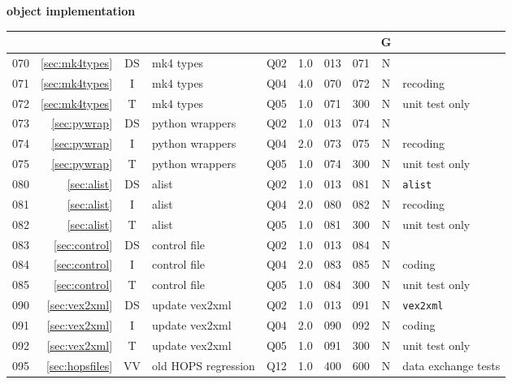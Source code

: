 \pagebreak
\small
\textbf{object implementation}\hfill\break
\noindent
\begin{tabular}{r|r|c|l|c|c|c|c|c|l}
\hline
\usebox{\NM}&\usebox{\REF}&\usebox{\WW}&\usebox{\TPC}&\usebox{\ST}&\usebox{\EFF}&\usebox{\PRD}&\usebox{\SCC}&G&\usebox{\CMTS}\\
\hline
\hline
070&\ref{sec:mk4types}             &DS& mk4 types            & Q02 & 1.0 & 013 & 071 & N &  \\
071&\ref{sec:mk4types}             &I & mk4 types            & Q04 & 4.0 & 070 & 072 & N & recoding  \\
072&\ref{sec:mk4types}             &T & mk4 types            & Q05 & 1.0 & 071 & 300 & N & unit test only \\
073&\ref{sec:pywrap}               &DS& python wrappers      & Q02 & 1.0 & 013 & 074 & N &  \\
074&\ref{sec:pywrap}               &I & python wrappers      & Q04 & 2.0 & 073 & 075 & N & recoding \\
075&\ref{sec:pywrap}               &T & python wrappers      & Q05 & 1.0 & 074 & 300 & N & unit test only \\
080&\ref{sec:alist}                &DS& alist                & Q02 & 1.0 & 013 & 081 & N & \texttt{alist} \\
081&\ref{sec:alist}                &I & alist                & Q04 & 2.0 & 080 & 082 & N & recoding \\
082&\ref{sec:alist}                &T & alist                & Q05 & 1.0 & 081 & 300 & N & unit test only \\
083&\ref{sec:control}              &DS& control file         & Q02 & 1.0 & 013 & 084 & N &  \\
084&\ref{sec:control}              &I & control file         & Q04 & 2.0 & 083 & 085 & N & coding \\
085&\ref{sec:control}              &T & control file         & Q05 & 1.0 & 084 & 300 & N & unit test only  \\
090&\ref{sec:vex2xml}              &DS& update vex2xml       & Q02 & 1.0 & 013 & 091 & N & \texttt{vex2xml} \\
091&\ref{sec:vex2xml}              &I & update vex2xml       & Q04 & 2.0 & 090 & 092 & N & coding \\
092&\ref{sec:vex2xml}              &T & update vex2xml       & Q05 & 1.0 & 091 & 300 & N & unit test only \\
095&\ref{sec:hopsfiles}            &VV& old HOPS regression  & Q12 & 1.0 & 400 & 600 & N & data exchange tests \\
\hline
\end{tabular}\vspace{6mm}

